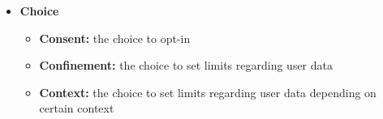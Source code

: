 \begin{itemize}

\item
  \textbf{Choice}
  \begin{itemize}
  \item
    \textbf{Consent:} the choice to opt-in
  \item
    \textbf{Confinement:} the choice to set limits regarding user data
  \item
    \textbf{Context:} the choice to set limits regarding user data
    depending on certain context
  \end{itemize}

\end{itemize}

